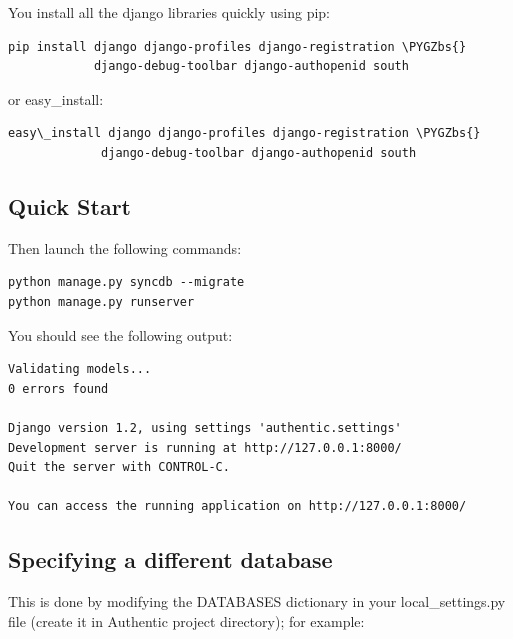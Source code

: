 \documentclass[letterpaper,10pt,english]{sphinxmanual}
\def\PYGZbs{\char`\\}
\begin{document}
You install all the django libraries quickly using pip:

\begin{Verbatim}[commandchars=\\\{\}]
pip install django django-profiles django-registration \PYGZbs{}
            django-debug-toolbar django-authopenid south
\end{Verbatim}

or easy\_install:

\begin{Verbatim}[commandchars=\\\{\}]
easy\_install django django-profiles django-registration \PYGZbs{}
             django-debug-toolbar django-authopenid south
\end{Verbatim}


\subsection{Quick Start}
\label{installation:quick-start}
Then launch the following commands:

\begin{Verbatim}[commandchars=\\\{\}]
python manage.py syncdb --migrate
python manage.py runserver
\end{Verbatim}

You should see the following output:

\begin{Verbatim}[commandchars=\\\{\}]
Validating models...
0 errors found

Django version 1.2, using settings 'authentic.settings'
Development server is running at http://127.0.0.1:8000/
Quit the server with CONTROL-C.

You can access the running application on http://127.0.0.1:8000/
\end{Verbatim}


\subsection{Specifying a different database}
\label{installation:specifying-a-different-database}
This is done by modifying the DATABASES dictionary in your local\_settings.py file
(create it in Authentic project directory); for example:
\end{document}
